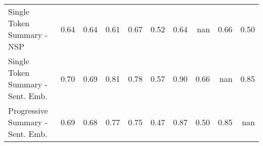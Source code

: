 \begin{tabular}{lrrrrrrrrr}
Single Token Summary - NSP & \cellcolor[RGB]{167,196,253}0.64 & \cellcolor[RGB]{164,194,254}0.64 & \cellcolor[RGB]{145,179,254}0.61 & \cellcolor[RGB]{187,209,247}0.67 & \cellcolor[RGB]{88,118,226}0.52 & \cellcolor[RGB]{164,194,254}0.64 & \cellcolor[RGB]{0,0,0}nan & \cellcolor[RGB]{179,204,250}0.66 & \cellcolor[RGB]{73,98,211}0.50 \\
Single Token Summary - Sent. Emb. & \cellcolor[RGB]{206,217,235}0.70 & \cellcolor[RGB]{200,215,239}0.69 & \cellcolor[RGB]{246,188,162}0.81 & \cellcolor[RGB]{239,206,188}0.78 & \cellcolor[RGB]{117,152,246}0.57 & \cellcolor[RGB]{234,125,97}0.90 & \cellcolor[RGB]{179,204,250}0.66 & \cellcolor[RGB]{0,0,0}nan & \cellcolor[RGB]{246,163,132}0.85 \\
Progressive Summary - Sent. Emb. & \cellcolor[RGB]{197,213,242}0.69 & \cellcolor[RGB]{192,211,245}0.68 & \cellcolor[RGB]{237,207,192}0.77 & \cellcolor[RGB]{231,214,205}0.75 & \cellcolor[RGB]{58,76,192}0.47 & \cellcolor[RGB]{242,145,115}0.87 & \cellcolor[RGB]{73,98,211}0.50 & \cellcolor[RGB]{246,163,132}0.85 & \cellcolor[RGB]{0,0,0}nan \\
\bottomrule
\end{tabular}
